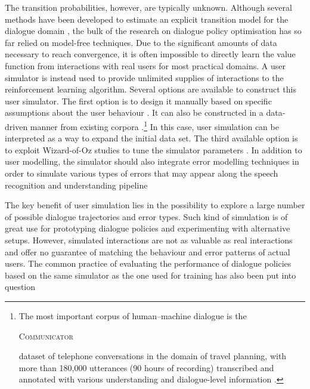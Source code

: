 The transition probabilities, however, are typically unknown.  Although several methods have been developed to estimate an explicit transition model for the dialogue domain \citep{SinghLKW02,tetreault2006using},  the bulk of the research on dialogue policy optimisation has so far relied on model-free techniques. Due to the significant amounts of data necessary to reach convergence, it is often impossible to directly learn the value function from interactions with real users for most practical domains.  A user simulator is instead used to provide unlimited supplies of interactions to the reinforcement learning algorithm.   Several options are available to construct this user simulator.  The first option is to design it manually based on specific assumptions about the user behaviour \citep{Pietquin:2006,Schatzmann:2007:AUS:1614108.1614146}.  It can also be constructed in a data-driven manner from existing corpora \citep{GeorgilaHL06}.\footnote{The most important corpus of human--machine dialogue is the \begin{small}\textsc{Communicator}\end{small} dataset of telephone conversations in the domain of travel planning, with more than 180,000 utterances (90 hours of recording) transcribed and annotated with various understanding and dialogue-level information \citep{BennettR02}.}  In this case, user simulation can be interpreted as a way to expand the initial data set.  The third available option is to exploit  Wizard-of-Oz studies to tune the simulator parameters \citep{Rieser:2010:LHM:1735495.1735497}.  In addition to user modelling, the simulator should also integrate error modelling techniques in order to simulate various types of errors that may appear along the speech recognition and understanding pipeline \citep{SchatzmannTY07,ThomsonGHTY12}

The key benefit of user simulation lies in the possibility to explore a large number of possible dialogue trajectories and error types.  Such kind of simulation is of great use for prototyping dialogue policies and experimenting with alternative setups. However, simulated interactions are not as valuable as real interactions and offer no guarantee of matching the behaviour and error patterns of actual users.  The common practice of evaluating the performance of dialogue policies based on the same simulator as the one used for training has also been put into question \citep{paek2006}

